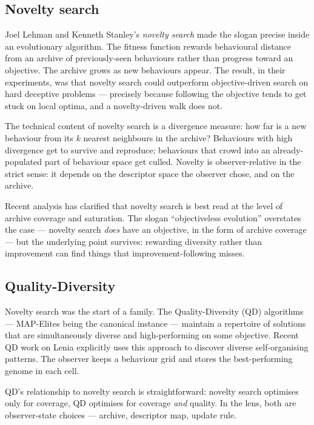 \subsection*{Novelty search}

Joel Lehman and Kenneth Stanley's \emph{novelty search} made the slogan
precise inside an evolutionary algorithm. The fitness function rewards
behavioural distance from an archive of previously-seen behaviours
rather than progress toward an objective. The archive grows as new
behaviours appear. The result, in their experiments, was that novelty
search could outperform objective-driven search on hard deceptive
problems --- precisely because following the objective tends to get
stuck on local optima, and a novelty-driven walk does not.

The technical content of novelty search is a divergence measure: how far
is a new behaviour from its $k$ nearest neighbours in the archive?
Behaviours with high divergence get to survive and reproduce; behaviours
that crowd into an already-populated part of behaviour space get culled.
Novelty is observer-relative in the strict sense: it depends on the
descriptor space the observer chose, and on the archive.

Recent analysis has clarified that novelty search is best read at the
level of archive coverage and saturation. The slogan ``objectiveless
evolution'' overstates the case --- novelty search \emph{does} have an
objective, in the form of archive coverage --- but the underlying point
survives: rewarding diversity rather than improvement can find things
that improvement-following misses.

\subsection*{Quality-Diversity}

Novelty search was the start of a family. The Quality-Diversity (QD)
algorithms --- MAP-Elites being the canonical instance --- maintain a
repertoire of solutions that are simultaneously diverse and
high-performing on some objective. Recent QD work on Lenia explicitly
uses this approach to discover diverse self-organising patterns. The
observer keeps a behaviour grid and stores the best-performing genome in
each cell.

QD's relationship to novelty search is straightforward: novelty search
optimises only for coverage, QD optimises for coverage \emph{and}
quality. In the lens, both are observer-state choices --- archive,
descriptor map, update rule.

